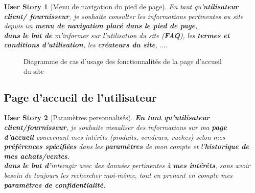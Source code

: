\documentclass[a4paper,12pt]{book}
\theoremstyle{break}
\newtheorem*{userStory}{User Story}
\theoremstyle{break}
\theoremstyle{break}
\theoremstyle{break}
\theoremstyle{definition}
\theoremstyle{remark}
\begin{document}
\begin{userStory}[Menu de navigation du pied de page]
En tant qu'\textbf{utilisateur} \textbf{{\color{green} client}/{\color{red} fournisseur}}, je souhaite consulter les informations pertinentes au site depuis un \textbf{menu de navigation placé dans le pied de page},\\
\indent
\textbf{dans le but de} m'informer sur l'utilisation du site (\textbf{FAQ}), les \textbf{termes et conditions d'utilisation}, les \textbf{créateurs du site}, $\dots$.
\end{userStory}

\begin{figure}[!ht]
  \centering
  \caption{Diagramme de cas d'usage des fonctionnalités de la page d'accueil du site}
  \label{fig:index_page_case_diagram}
\end{figure}

\subsection{Page d'accueil de l'utilisateur}
\begin{userStory}[Paramètres personnalisés]
\textbf{En tant qu'utilisateur {\color{green}client}/{\color{red}fournisseur}}, je souhaite visualiser des informations sur ma \textbf{page d'accueil} concernant mes intérêts (produits, vendeurs, ruches) selon mes \textbf{préférences spécifiées} dans les \textbf{paramètres} de mon compte et l'\textbf{historique de mes achats/ventes}.\\
\indent
\textbf{dans le but d'}interagir avec des données pertinentes à \textbf{mes intérêts}, sans avoir besoin de toujours les rechercher moi-même, tout en prenant en compte mes \textbf{paramètres de confidentialité}.
\end{userStory}
\end{document}
